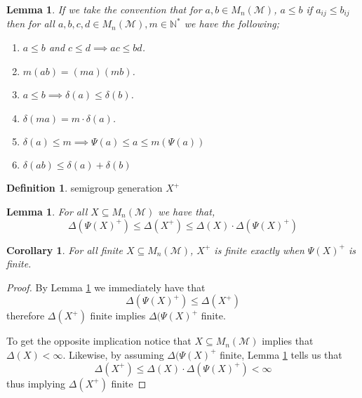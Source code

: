 \documentclass[12pt,a4paper]{amsart}
\newcommand{\N}{\mathbb{N}}
\newcommand{\TM}{\mathcal{M}}
\newtheorem{cor}{Corollary}[thm]
\newtheorem{lem}[thm]{Lemma}
\theoremstyle{definition}
\newtheorem{defn}{Definition}[section]
\theoremstyle{remark}
\begin{document}
\begin{lem}\label{lem:simon1}
If we take the convention that for $a,b\in M_n(\TM)$, $a\leq b$ if $a_{ij}\leq b_{ij}$ then for all $a,b,c,d\in M_n(\TM), m\in\N^*$ we have the following;
\begin{enumerate}
    \item $a\leq b$ and $c\leq d \implies ac \leq bd$.
    \item $m(ab) = (ma)(mb)$.
    \item $a\leq b \implies \delta(a)\leq \delta(b)$.
    \item $\delta(ma) = m\cdot\delta(a)$.
    \item $\delta(a)\leq m \implies \Psi(a)\leq a\leq m(\Psi(a))$
    \item $\delta(ab)\leq\delta(a)+\delta(b)$
\end{enumerate}
\end{lem}

\begin{defn}
semigroup generation $X^+$
\end{defn}

\begin{lem}\label{lem:simon2}
For all $X\subseteq M_n(\TM)$ we have that,
\begin{equation}
    \Delta(\Psi(X)^+)\leq\Delta(X^+)\leq\Delta(X)\cdot\Delta(\Psi(X)^+)
\end{equation}
\end{lem}
%

\begin{cor}\label{cor:simon1}
For all finite $X\subseteq M_n(\TM)$, $X^+$ is finite exactly when $\Psi(X)^+$ is finite.
\end{cor}
\begin{proof}
By Lemma \ref{lem:simon2} we immediately have that
\begin{equation*}
    \Delta(\Psi(X)^+)\leq\Delta(X^+)
\end{equation*}
therefore $\Delta(X^+)$ finite implies $\Delta(\Psi(X)^+$ finite.

To get the opposite implication notice that $X\subseteq M_n(\TM)$ implies that $\Delta(X)<\infty$. Likewise, by assuming $\Delta(\Psi(X)^+$ finite,  Lemma \ref{lem:simon2} tells us that
\begin{equation*}
    \Delta(X^+)\leq\Delta(X)\cdot\Delta(\Psi(X)^+)<\infty
\end{equation*}
thus implying $\Delta(X^+)$ finite
\end{proof}
\end{document}
